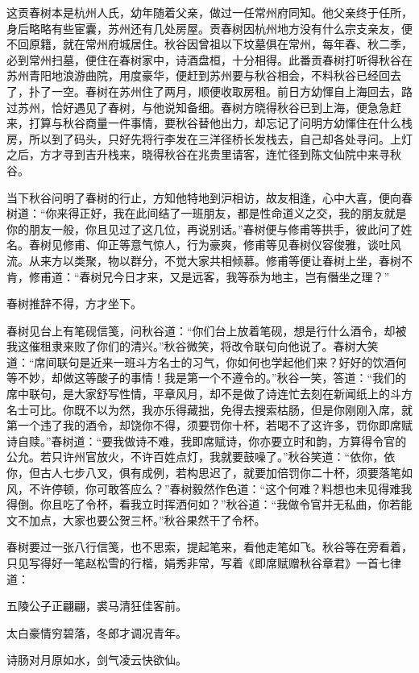 \documentclass[12pt,UTF8]{ctexbook}
\begin{document}
{{{这贡春树本是杭州人氏，幼年随着父亲，做过一任常州府同知。他父亲终于任所，身后略略有些宦囊，苏州还有几处房屋。贡春树因杭州地方没有什么宗支亲友，便不回原籍，就在常州府城居住。秋谷因曾祖以下坟墓俱在常州，每年春、秋二季，必到常州扫墓，便住在春树家中，诗酒盘桓，十分相得。此番贡春树打听得秋谷在苏州青阳地浪游曲院，用度豪华，便赶到苏州要与秋谷相会，不料秋谷已经回去了，扑了一空。春树在苏州住了两月，顺便收取房租。前日方幼惲自上海回去，路过苏州，恰好遇见了春树，与他说知备细。春树方晓得秋谷已到上海，便急急赶来，打算与秋谷商量一件事情，要秋谷替他出力，却忘记了问明方幼惲住在什么栈房，所以到了码头，只好先将行李发在三洋径桥长发栈去，自己却各处寻问。上灯之后，方才寻到吉升栈来，晓得秋谷在兆贵里请客，连忙径到陈文仙院中来寻秋谷。

当下秋谷问明了春树的行止，方知他特地到沪相访，故友相逢，心中大喜，便向春树道：“你来得正好，我在此间结了一班朋友，都是性命道义之交，我的朋友就是你的朋友一般，你且见过了这几位，再说别话。”春树便与修甫等拱手，彼此问了姓名。春树见修甫、仰正等意气惊人，行为豪爽，修甫等见春树仪容俊雅，谈吐风流。从来方以类聚，物以群分，不觉大家共相倾慕。修甫等便让春树上坐，春树不肯，修甫道：“春树兄今日才来，又是远客，我等忝为地主，岂有僭坐之理？”

春树推辞不得，方才坐下。

春树见台上有笔砚信笺，问秋谷道：“你们台上放着笔砚，想是行什么酒令，却被我这催租隶来败了你们的清兴。”秋谷微笑，将改令联句向他说了。春树大笑道：“席间联句是近来一班斗方名士的习气，你如何也学起他们来？好好的饮酒何等不妙，却做这等酸子的事情！我是第一个不遵令的。”秋谷一笑，答道：“我们的席中联句，是大家舒写性情，平章风月，却不是做了诗连忙去刻在新闻纸上的斗方名士可比。你既不以为然，我亦乐得藏拙，免得去搜索枯肠，但是你刚刚入席，就第一个违了我的酒令，却饶你不得，须要罚你十杯，若喝不了这许多，罚你即席赋诗自赎。”春树道：“要我做诗不难，我即席赋诗，你亦要立时和韵，方算得令官的公允。若只许州官放火，不许百姓点灯，我就要鼓噪了。”秋谷笑道：“依你，依你，但古人七步八叉，俱有成例，若构思迟了，就要加倍罚你二十杯，须要落笔如风，不许停顿，你可敢答应么？”春树毅然作色道：“这个何难？料想也未见得难我得倒。你且吃了令杯，看我立时挥洒何如？”秋谷道：“我做令官并无私曲，你若能文不加点，大家也要公贺三杯。”秋谷果然干了令杯。

春树要过一张八行信笺，也不思索，提起笔来，看他走笔如飞。秋谷等在旁看着，只见写得好一笔赵松雪的行楷，娟秀非常，写着《即席赋赠秋谷章君》一首七律道：

五陵公子正翩翩，裘马清狂佳客前。

太白豪情穷碧落，冬郎才调况青年。

诗肠对月原如水，剑气凌云快欲仙。

}}}
\end{document}
